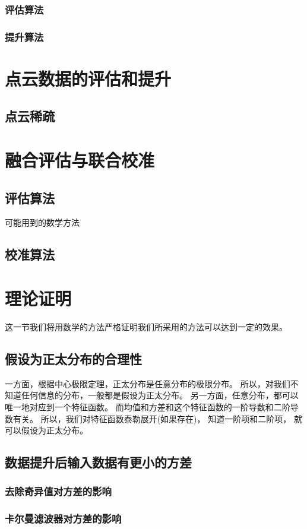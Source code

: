 \documentclass{amsart}
\begin{document}
\subsubsection{评估算法}
\label{sec:0101}

\subsubsection{提升算法}
\label{sec:0102}
\section{点云数据的评估和提升}
\subsection{点云稀疏}
\section{融合评估与联合校准}
\subsection{评估算法}
可能用到的数学方法

\subsection{校准算法}
\section{理论证明}
这一节我们将用数学的方法严格证明我们所采用的方法可以达到一定的效果。
\subsection{假设为正太分布的合理性}
一方面，根据中心极限定理，正太分布是任意分布的极限分布。
所以，对我们不知道任何信息的分布，一般都是假设为正太分布。
另一方面，任意分布，都可以唯一地对应到一个特征函数。
而均值和方差和这个特征函数的一阶导数和二阶导数有关。
所以，我们对特征函数泰勒展开(如果存在)，
知道一阶项和二阶项，
就可以假设为正太分布。
\subsection{数据提升后输入数据有更小的方差}
\subsubsection{去除奇异值对方差的影响}
\subsubsection{卡尔曼滤波器对方差的影响}
\end{document}
